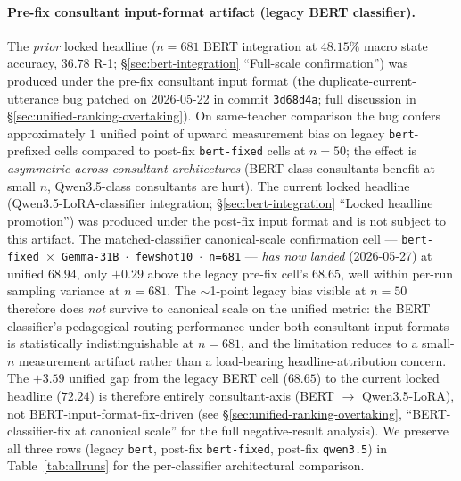 \documentclass[11pt]{article}
\begin{document}
\paragraph{Pre-fix consultant input-format artifact (legacy BERT classifier).} The \emph{prior} locked headline ($n{=}681$ BERT integration at $48.15\%$ macro state accuracy, $36.78$ R-1; \S\ref{sec:bert-integration} ``Full-scale confirmation'') was produced under the pre-fix consultant input format (the duplicate-current-utterance bug patched on 2026-05-22 in commit \texttt{3d68d4a}; full discussion in \S\ref{sec:unified-ranking-overtaking}). On same-teacher comparison the bug confers approximately $1$ unified point of upward measurement bias on legacy \texttt{bert}-prefixed cells compared to post-fix \texttt{bert-fixed} cells at $n{=}50$; the effect is \emph{asymmetric across consultant architectures} (BERT-class consultants benefit at small $n$, Qwen3.5-class consultants are hurt). The current locked headline (Qwen3.5-LoRA-classifier integration; \S\ref{sec:bert-integration} ``Locked headline promotion'') was produced under the post-fix input format and is not subject to this artifact. The matched-classifier canonical-scale confirmation cell --- \texttt{bert-fixed $\times$ Gemma-31B $\cdot$ fewshot10 $\cdot$ n=681} --- \emph{has now landed} (2026-05-27) at unified $68.94$, only $+0.29$ above the legacy pre-fix cell's $68.65$, well within per-run sampling variance at $n{=}681$. The $\sim$1-point legacy bias visible at $n{=}50$ therefore does \emph{not} survive to canonical scale on the unified metric: the BERT classifier's pedagogical-routing performance under both consultant input formats is statistically indistinguishable at $n{=}681$, and the limitation reduces to a small-$n$ measurement artifact rather than a load-bearing headline-attribution concern. The $+3.59$ unified gap from the legacy BERT cell ($68.65$) to the current locked headline ($72.24$) is therefore entirely consultant-axis (BERT $\to$ Qwen3.5-LoRA), not BERT-input-format-fix-driven (see \S\ref{sec:unified-ranking-overtaking}, ``BERT-classifier-fix at canonical scale'' for the full negative-result analysis). We preserve all three rows (legacy \texttt{bert}, post-fix \texttt{bert-fixed}, post-fix \texttt{qwen3.5}) in Table~\ref{tab:allruns} for the per-classifier architectural comparison.
\end{document}
